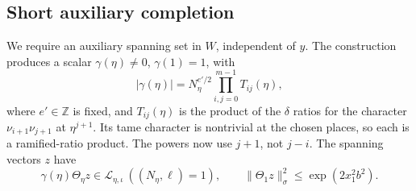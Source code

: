 \subsection{Short auxiliary completion}\label{c3:auxiliary}

We require an auxiliary spanning set in $W$, independent of $y$.
The construction produces a scalar $\gamma(\eta)\ne0$,
$\gamma(1)=1$, with
\begin{equation}\label{c3:gamma}
 |\gamma(\eta)|=N_\eta^{e'/2}
       \prod_{i,j=0}^{m-1}T_{ij}(\eta),
\end{equation}
where $e'\in\mathbb Z$ is fixed, and $T_{ij}(\eta)$ is the
product of the $\delta$ ratios for the character $\nu_{i+1}\nu_{j+1}$
at $\eta^{j+1}$. Its tame character is nontrivial at the chosen
places, so each is a ramified-ratio product. The powers now use
$j+1$, not $j-i$. The spanning vectors $z$ have
\begin{equation}\label{c3:auxbounds}
 \gamma(\eta)\Theta_\eta z\in\mathcal L_{\eta,\iota}
 \ ((N_\eta,\ell)=1),\qquad
 \|\Theta_1z\|_\sigma^2\le\exp(2x_1^2b^2).
\end{equation}

